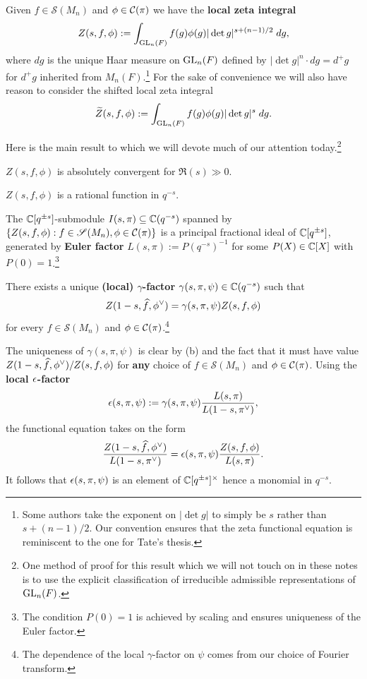 \documentclass[11pt]{article}
\renewcommand{\S}{\mathscr{S}}
\newcommand{\twid}{\widetilde}
\begin{document}
Given $f\in\S(M_n)$ and $\phi\in\mathcal{C}(\pi)$ we have the \textbf{local zeta integral}
$$Z(s,f,\phi):=\int_{\textup{GL}_n(F)}f(g)\phi(g)|\det g|^{s+(n-1)/2}\;dg,$$
where $dg$ is the unique Haar measure on $\textup{GL}_n(F)$ defined by $|\det g|^n\cdot dg=d^+g$ for $d^+g$ inherited from $M_n(F)$.\footnote{Some authors take the exponent on $|\det g|$ to simply be $s$ rather than $s+(n-1)/2$. Our convention ensures that the zeta functional equation is reminiscent to the one for Tate's thesis.} For the sake of convenience we will also have reason to consider the shifted local zeta integral
$$\twid{Z}(s,f,\phi):=\int_{\GL_n(F)}f(g)\phi(g)|\det g|^s\;dg.$$

Here is the main result to which we will devote much of our attention today.\footnote{One method of proof for this result which we will not touch on in these notes is to use the explicit classification of irreducible admissible representations of $\textup{GL}_n(F)$.}

\begin{theorem}\label{main_thm}
\hfill
\begin{enum}{\alph}
\item $Z(s,f,\phi)$ is absolutely convergent for $\Re(s)\gg0$.

\item $Z(s,f,\phi)$ is a rational function in $q^{-s}$.

\item The $\mathbb{C}[q^{\pm s}]$-submodule $I(s,\pi)\subseteq\mathbb{C}(q^{-s})$ spanned by $\{Z(s,f,\phi) : f\in\S(M_n),\phi\in\mc{C}(\pi)\}$ is a principal fractional ideal of $\mathbb{C}[q^{\pm s}]$, generated by \textbf{Euler factor} $L(s,\pi):=P(q^{-s})^{-1}$ for some $P(X)\in\mathbb{C}[X]$ with $P(0)=1$.\footnote{The condition $P(0)=1$ is achieved by scaling and ensures uniqueness of the Euler factor.}

\item There exists a unique \textbf{(local) $\gamma$-factor} $\gamma(s,\pi,\psi)\in\mathbb{C}(q^{-s})$ such that 
$$Z(1-s,\widehat{f},\phi^{\vee})=\gamma(s,\pi,\psi)Z(s,f,\phi)$$
for every $f\in\S(M_n)$ and $\phi\in\mathcal{C}(\pi)$.\footnote{The dependence of the local $\gamma$-factor on $\psi$ comes from our choice of Fourier transform.}
\end{enum}
\end{theorem}

The uniqueness of $\gamma(s,\pi,\psi)$ is clear by (b) and the fact that it must have value $Z(1-s,\widehat{f},\phi^{\vee})/Z(s,f,\phi)$ for \textbf{any} choice of $f\in\S(M_n)$ and $\phi\in\mathcal{C}(\pi)$. Using the \textbf{local $\epsilon$-factor} 
$$\epsilon(s,\pi,\psi):=\gamma(s,\pi,\psi)\dfrac{L(s,\pi)}{L(1-s,\pi^{\vee})},$$
the functional equation takes on the form 
\begin{align*}
\dfrac{Z(1-s,\widehat{f},\phi^{\vee})}{L(1-s,\pi^{\vee})}
=\epsilon(s,\pi,\psi)\dfrac{Z(s,f,\phi)}{L(s,\pi)}.
\end{align*}
It follows that $\epsilon(s,\pi,\psi)$ is an element of $\mathbb{C}[q^{\pm s}]^{\times}$ hence a monomial in $q^{-s}$.
\end{document}
